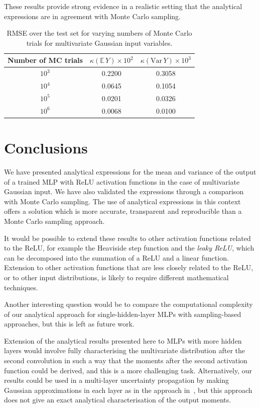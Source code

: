 \documentclass{article}
\newcommand{\EE}{\mathbb{E}}
\begin{document}
These results provide strong evidence in a realistic setting that the analytical expressions are in agreement with Monte Carlo sampling.

\begin{table}[h!]
    \centering
    \begin{tabular}{|c|cc|}
    \hline
        Number of MC trials & $\kappa(\EE\,Y)\times 10^2$ &  $\kappa(\textrm{Var}\,Y)\times 10^3$\\
        \hline
        $10^3$ & 0.2200 & 0.3058\\
        $10^4$ & 0.0645 & 0.1054\\
        $10^5$ & 0.0201 & 0.0326\\
        $10^6$ & 0.0068 & 0.0100\\
    \hline
    \end{tabular}
    \caption{RMSE over the test set for varying numbers of Monte Carlo trials for multivariate Gaussian input variables.}
    \label{accuracy_table}
\end{table}

\section{Conclusions}\label{discussion}

We have presented analytical expressions for the mean and variance of the output of a trained MLP with ReLU activation functions in the case of multivariate Gaussian input. We have also validated the expressions through a comparison with Monte Carlo sampling. The use of analytical expressions in this context offers a solution which is more accurate, transparent and reproducible than a Monte Carlo sampling approach.

It would be possible to extend these results to other activation functions related to the ReLU, for example the Heaviside step function and the \emph{leaky ReLU}, which can be decomposed into the summation of a ReLU and a linear function. Extension to other activation functions that are less closely related to the ReLU, or to other input distributions, is likely to require different mathematical techniques.

Another interesting question would be to compare the computational complexity of our analytical approach for single-hidden-layer MLPs with sampling-based approaches, but this is left as future work.

Extension of the analytical results presented here to MLPs with more hidden layers would involve fully characterising the multivariate distribution after the second convolution in such a way that the moments after the second activation function could be derived, and this is a more challenging task. Alternatively, our results could be used in a multi-layer uncertainty propagation by making Gaussian approximations in each layer as in the approach in~\cite{wright2024analytic}, but this approach does not give an exact analytical characterisation of the output moments.  
\end{document}
